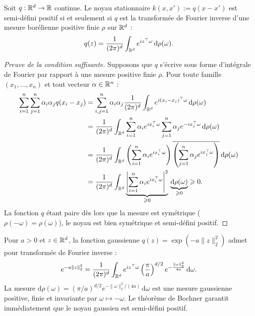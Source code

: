 \begin{theorem}
    Soit $q : \mathbb{R}^d \to \mathbb{R}$ continue. Le noyau stationnaire $k(x, x') := q(x - x')$ est semi-défini positif si et seulement si $q$ est la transformée de Fourier inverse d'une mesure borélienne positive finie $\rho$ sur $\mathbb{R}^d$ :
    \begin{equation}
        q(z) = \frac{1}{(2\pi)^d} \int_{\mathbb{R}^d} e^{i z^\top \omega} \, \mathrm{d}\rho(\omega).
    \end{equation}
\end{theorem}

\begin{proof}[Preuve de la condition suffisante]
    Supposons que $q$ s'écrive sous forme d'intégrale de Fourier par rapport à une mesure positive finie $\rho$. Pour toute famille $(x_1, \dots, x_n)$ et tout vecteur $\alpha \in \mathbb{R}^n$ :
    \begin{align*}
        \sum_{i=1}^n \sum_{j=1}^n \alpha_i \alpha_j q(x_i - x_j) 
        &= \sum_{i,j=1}^n \alpha_i \alpha_j \frac{1}{(2 \pi)^d} \int_{\mathbb{R}^d} e^{i (x_i - x_j)^\top \omega} \, \mathrm{d}\rho(\omega) \\ 
        &= \frac{1}{(2 \pi)^d} \int_{\mathbb{R}^d} \sum_{i=1}^n \alpha_i e^{i x_i^\top \omega} \sum_{j=1}^n \alpha_j e^{-i x_j^\top \omega} \, \mathrm{d}\rho(\omega) \\ 
        &= \frac{1}{(2 \pi)^d} \int_{\mathbb{R}^d} \left( \sum_{i=1}^n \alpha_i e^{i x_i^\top \omega} \right) \overline{\left( \sum_{j=1}^n \alpha_j e^{i x_j^\top \omega} \right)} \, \mathrm{d}\rho(\omega) \\
        &= \frac{1}{(2 \pi)^d} \int_{\mathbb{R}^d} \underbrace{\left| \sum_{i=1}^n \alpha_i e^{i x_i^\top \omega} \right|^2}_{\geqslant 0} \, \underbrace{\mathrm{d}\rho(\omega)}_{\geqslant 0} \geqslant 0.
    \end{align*}
    La fonction $q$ étant paire dès lors que la mesure est symétrique ($\rho(-\omega) = \rho(\omega)$), le noyau est bien symétrique et semi-défini positif.
\end{proof}

\begin{example}
    Pour $a > 0$ et $z \in \mathbb{R}^d$, la fonction gaussienne $q(z) = \exp(-a \|z\|_2^2)$ admet pour transformée de Fourier inverse :
    \begin{equation*}
        e^{-a \|z\|_2^2} = \frac{1}{(2\pi)^d} \int_{\mathbb{R}^d} e^{i z^\top \omega} \left( \frac{\pi}{a} \right)^{d/2} e^{-\frac{\|\omega\|_2^2}{4a}} \, \mathrm{d}\omega.
    \end{equation*}
    La mesure $\mathrm{d}\rho(\omega) = (\pi/a)^{d/2} e^{-\|\omega\|_2^2/(4a)} \, \mathrm{d}\omega$ est une mesure gaussienne positive, finie et invariante par $\omega \mapsto -\omega$. Le théorème de Bochner garantit immédiatement que le noyau gaussien est semi-défini positif.
\end{example}

